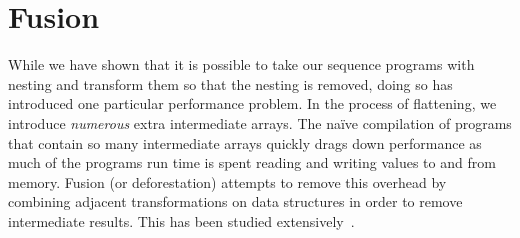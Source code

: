 \section{Fusion}
\label{sec:Optimisation}

While we have shown that it is possible to take our sequence programs with nesting and transform them so that the nesting is removed, doing so has introduced one particular performance problem. In the process of flattening, we introduce \emph{numerous} extra intermediate arrays. The na\"ive compilation of programs that contain so many intermediate arrays quickly drags down performance as much of the programs run time is spent reading and writing values to and from memory. Fusion
(or deforestation) attempts to remove this overhead
by combining adjacent transformations on data structures in order to remove
intermediate results. This has been studied
extensively~\cite{Wadler:1990ix,Coutts:stream-fusion,Lippmeier:Guiding,McDonell:acc-optim,Lippmeier:flow-fusion}.






